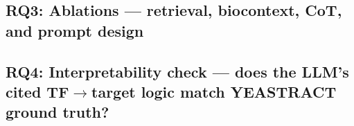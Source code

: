 \subsection{RQ3: Ablations — retrieval, biocontext, CoT, and prompt design}

\subsection{RQ4: Interpretability check — does the LLM's cited TF$\to$target logic match YEASTRACT ground truth?}
